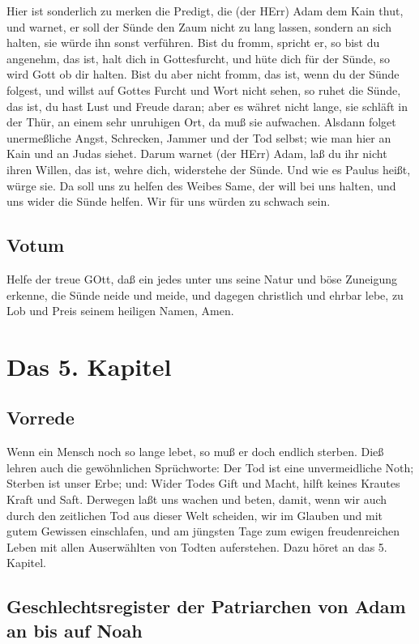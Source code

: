 Hier ist sonderlich zu merken die Predigt, die (der HErr) Adam dem Kain thut, und warnet, er soll der Sünde den Zaum nicht zu lang lassen, sondern an sich halten, sie würde ihn sonst verführen. Bist du fromm, spricht er, so bist du angenehm, das ist, halt dich in Gottesfurcht, und hüte dich für der Sünde, so wird Gott ob dir halten. Bist du aber nicht fromm, das ist, wenn du der Sünde folgest, und willst auf Gottes Furcht und Wort nicht sehen, so ruhet die Sünde, das ist, du hast Lust und Freude daran; aber es währet nicht lange, sie schläft in der Thür, an einem sehr unruhigen Ort, da muß sie aufwachen. Alsdann folget unermeßliche Angst, Schrecken, Jammer und der Tod selbst; wie man hier an Kain und an Judas siehet. Darum warnet (der HErr) Adam, laß du ihr nicht ihren Willen, das ist, wehre dich, widerstehe der Sünde. Und wie es Paulus heißt, würge sie. Da soll uns zu helfen des Weibes Same, der will bei uns halten, und uns wider die Sünde helfen. Wir für uns würden zu schwach sein.

\section{Votum}

Helfe der treue GOtt, daß ein jedes unter uns seine Natur und böse Zuneigung erkenne, die Sünde neide und meide, und dagegen christlich und ehrbar lebe, zu Lob und Preis seinem heiligen Namen, Amen.

\chapter{Das 5. Kapitel}

\section{Vorrede}

Wenn ein Mensch noch so lange lebet, so muß er doch endlich sterben. Dieß lehren auch die gewöhnlichen Sprüchworte: Der Tod ist eine unvermeidliche Noth; Sterben ist unser Erbe; und: Wider Todes Gift und Macht, hilft keines Krautes Kraft und Saft. Derwegen laßt uns wachen und beten, damit, wenn wir auch durch den zeitlichen Tod aus dieser Welt scheiden, wir im Glauben und mit gutem Gewissen einschlafen, und am jüngsten Tage zum ewigen freudenreichen Leben mit allen Auserwählten von Todten auferstehen. Dazu höret an das 5. Kapitel.

\section[Geschlechtsregister der Patriarchen von Adam an bis auf]{Geschlechtsregister der Patriarchen von Adam an bis auf Noah}

